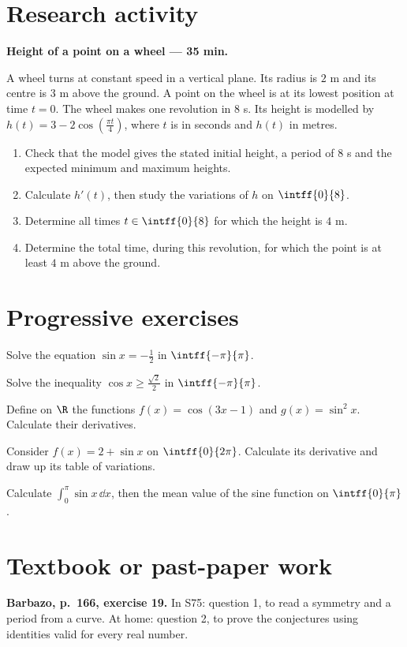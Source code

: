 \mxnewpage
\section{Research activity}\textbf{Height of a point on a wheel --- 35 min.}\par A wheel turns at constant speed in a vertical plane. Its radius is $2$ m and its centre is $3$ m above the ground. A point on the wheel is at its lowest position at time $t=0$. The wheel makes one revolution in $8$ s. Its height is modelled by $h(t)=3-2\cos\left(\frac{\pi t}{4}\right)$, where $t$ is in seconds and $h(t)$ in metres.
\begin{enumerate}\item Check that the model gives the stated initial height, a period of $8$ s and the expected minimum and maximum heights.
\item Calculate $h' (t)$, then study the variations of $h$ on $\intff{0}{8}$.
\item Determine all times $t\in\intff{0}{8}$ for which the height is $4$ m.
\item Determine the total time, during this revolution, for which the point is at least $4$ m above the ground.\end{enumerate}

\mxnewpage
\section{Progressive exercises}

Solve the equation $\sin x=-\frac12$ in $\intff{-\pi}{\pi}$.

Solve the inequality $\cos x\ge\frac{\sqrt2}{2}$ in $\intff{-\pi}{\pi}$.

Define on $\R$ the functions $f(x)=\cos(3x-1)$ and $g(x)=\sin^2x$. Calculate their derivatives.

Consider $f(x)=2+\sin x$ on $\intff{0}{2\pi}$. Calculate its derivative and draw up its table of variations.

Calculate $\displaystyle\int_0^\pi\sin x\,\dd x$, then the mean value of the sine function on $\intff{0}{\pi}$.

\section{Textbook or past-paper work}\textbf{Barbazo, p.~166, exercise 19.} In S75: question 1, to read a symmetry and a period from a curve. At home: question 2, to prove the conjectures using identities valid for every real number.

